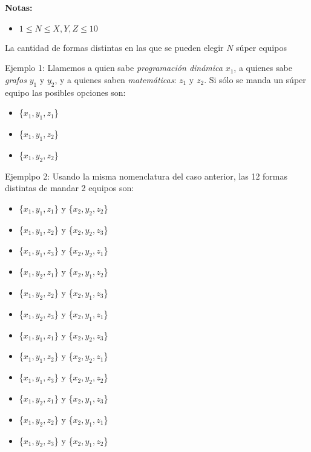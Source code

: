 \textbf{Notas:}
\begin{itemize}
    \item $1 \le N \le X, Y, Z \le 10$
\end{itemize}

\outputText

La cantidad de formas distintas en las que se pueden elegir $N$ súper equipos

\exampleCases

\begin{example}
\end{example}

\explanationText

Ejemplo 1:
Llamemos a quien sabe \emph{programación dinámica} $x_1$, a quienes sabe \emph{grafos} $y_1$ y $y_2$, y a quienes saben \emph{matemáticas}: $z_1$ y $z_2$. Si sólo se manda un súper equipo las posibles opciones son: \begin{itemize}
    \item \{$x_1, y_1, z_1$\}
    \item \{$x_1, y_1, z_2$\}
    \item \{$x_1, y_2, z_2$\}
\end{itemize}
Ejemplpo 2:
Usando la misma nomenclatura del caso anterior, las 12 formas distintas de mandar 2 equipos son:
\begin{itemize}
\item  \{$x_1, y_1, z_1$\} y \{$x_2, y_2, z_2$\}
\item  \{$x_1, y_1, z_2$\} y \{$x_2, y_2, z_3$\}
\item  \{$x_1, y_1, z_3$\} y \{$x_2, y_2, z_1$\}
\item  \{$x_1, y_2, z_1$\} y \{$x_2, y_1, z_2$\}
\item  \{$x_1, y_2, z_2$\} y \{$x_2, y_1, z_3$\}
\item  \{$x_1, y_2, z_3$\} y \{$x_2, y_1, z_1$\}
\item  \{$x_1, y_1, z_1$\} y \{$x_2, y_2, z_3$\}
\item  \{$x_1, y_1, z_2$\} y \{$x_2, y_2, z_1$\}
\item  \{$x_1, y_1, z_3$\} y \{$x_2, y_2, z_2$\}
\item  \{$x_1, y_2, z_1$\} y \{$x_2, y_1, z_3$\}
\item  \{$x_1, y_2, z_2$\} y \{$x_2, y_1, z_1$\}
\item  \{$x_1, y_2, z_3$\} y \{$x_2, y_1, z_2$\}
\end{itemize}
